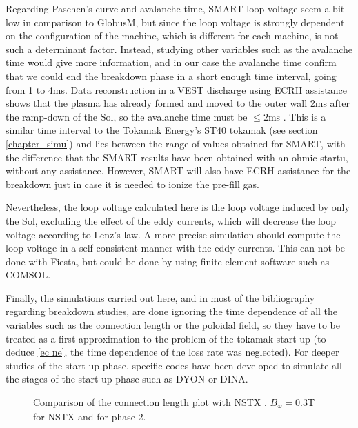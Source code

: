 \documentclass[a4paper,12pt,oneside]{book}
\begin{document}
Regarding Paschen's curve and avalanche time, SMART loop voltage seem a bit low in comparison to GlobusM, but since the loop voltage is strongly dependent on the configuration of the machine, which is different for each machine, is not such a determinant factor. Instead, studying other variables such as the avalanche time would give more information, and in our case the avalanche time confirm that we could end the breakdown phase in a short enough time interval, going from 1 to 4ms. Data reconstruction in a VEST discharge using ECRH assistance shows that the plasma has already formed and moved to the outer wall 2ms after the ramp-down of the Sol, so the avalanche time must be $\leq 2$ms \cite{VEST_2015}. This is a similar time interval to the Tokamak Energy's ST40 tokamak (see section \ref{chapter_simu}) and lies between the range of values obtained for SMART, with the difference that the SMART results have been obtained with an ohmic startu, without any assistance. However, SMART will also have ECRH assistance for the breakdown just in case it is needed to ionize the pre-fill gas.

Nevertheless, the loop voltage calculated here is the loop voltage induced by only the Sol, excluding the effect of the eddy currents, which will decrease the loop voltage according to Lenz's law. A more precise simulation should compute the loop voltage in a self-consistent manner with the eddy currents. This can not be done with Fiesta, but could be done by using finite element software such as COMSOL.

Finally, the simulations carried out here, and in most of the bibliography regarding breakdown studies, are done ignoring the time dependence of all the variables such as the connection length or the poloidal field, so they have to be treated as a first approximation to the problem of the tokamak start-up (to deduce \eqref{ec ne}, the time dependence of the loss rate was neglected). For deeper studies of the start-up phase, specific codes have been developed to simulate all the stages of the start-up phase such as DYON \cite{KimThesis} or DINA.

\begin{figure}[htbp]
\centering
{}
\hfill
{}

\hfill
{}


\caption{Comparison of the connection length plot with NSTX \cite{NSTX_2017} \cite{NSTX_cross}. $B_\varphi=0.3$T for NSTX and for phase 2.}
\label{fig_L_NSTX}
\end{figure}
\end{document}
